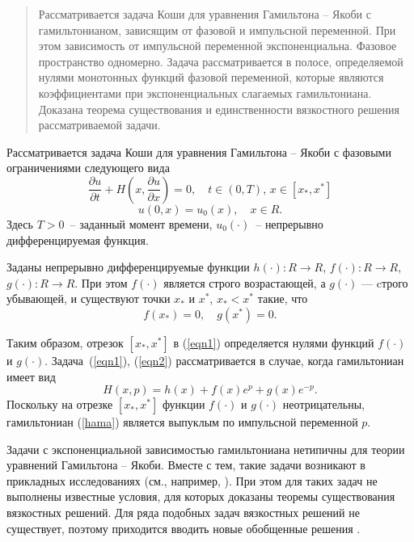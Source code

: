 \begin{abstract}
Рассматривается задача Коши для уравнения Гамильтона -- Якоби с гамильтонианом, зависящим от фазовой и импульсной переменной.
При этом зависимость от импульсной переменной экспоненциальна. Фазовое пространство одномерно. Задача рассматривается в полосе, определяемой нулями монотонных функций фазовой переменной, которые являются коэффициентами при экспоненциальных слагаемых гамильтониана. Доказана теорема существования и единственности вязкостного решения рассматриваемой задачи.

\end{abstract}

Рассматривается задача Коши для уравнения Гамильтона -- Якоби с фазовыми ограничениями следующего вида
\begin{equation}\label{eqn1}
\frac{\partial u}{\partial t} + H\left(x, \frac{\partial u}{\partial x}\right)=0, \quad  t \in (0,T), \, x \in [x_*, x^*]
\end{equation}
\begin{equation}\label{eqn2}
u(0,x)=u_0(x),  \quad x \in R.
\end{equation}
Здесь $T > 0$~-- заданный момент времени, $u_0(\cdot)$~-- непрерывно дифференцируемая функция.

Заданы непрерывно дифференцируемые функции $h(\cdot): R \rightarrow R$, \quad $f(\cdot): R \rightarrow R$, \quad $g(\cdot):R \rightarrow R$. При этом $f(\cdot)$ является строго возрастающей, а $g(\cdot)$ --- cтрого убывающей, и существуют точки $x_*$ и $x^*$, \quad $x_* < x^*$ такие, что
$$
f(x_*)=0, \quad g(x^*)=0.$$

Таким образом, отрезок $[x_*, x^*]$ в (\ref{eqn1}) определяется нулями функций $f(\cdot)$ и $g(\cdot)$. Задача~(\ref{eqn1}), (\ref{eqn2}) рассматривается в случае, когда гамильтониан имеет вид
\begin{equation}\label{hama}
H(x,p)=h(x)+f(x)e^p +g(x)e^{-p}.
\end{equation}
Поскольку на отрезке $[x_*, x^*]$ функции $f(\cdot)$ и $g(\cdot)$ неотрицательны, гамильтониан (\ref{hama}) является выпуклым по импульсной переменной $p$.

Задачи с экспоненциальной зависимостью гамильтониана нетипичны для теории уравнений Гамильтона -- Якоби. Вместе с тем, такие задачи возникают в прикладных исследованиях (см., например, \cite{Saak}). При этом для таких задач не выполнены известные условия, для которых доказаны теоремы существования вязкостных \cite{Crandall} решений. Для ряда подобных задач вязкостных решений не существует, поэтому приходится вводить новые обобщенные решения \cite{SubbShag}.

